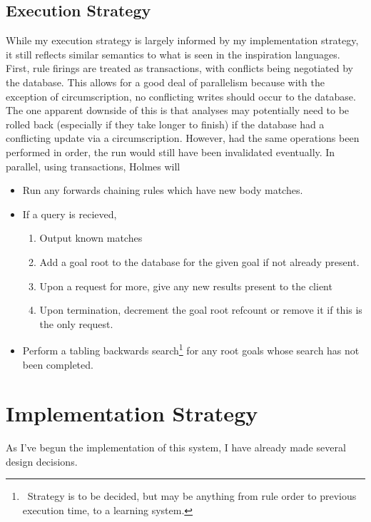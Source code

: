 \subsection{Execution Strategy}
While my execution strategy is largely informed by my implementation strategy, it still reflects similar semantics to what is seen in the inspiration languages.
First, rule firings are treated as transactions, with conflicts being negotiated by the database.
This allows for a good deal of parallelism because with the exception of circumscription, no conflicting writes should occur to the database.
The one apparent downside of this is that analyses may potentially need to be rolled back (especially if they take longer to finish) if the database had a conflicting update via a circumscription.
However, had the same operations been performed in order, the run would still have been invalidated eventually.
In parallel, using transactions, Holmes will
\begin{itemize}
\item Run any forwards chaining rules which have new body matches. 
\item If a query is recieved,
        \begin{enumerate}
                \item Output known matches
                \item Add a goal root to the database for the given goal if not already present.
                \item Upon a request for more, give any new results present to the client
                \item Upon termination, decrement the goal root refcount or remove it if this is the only request.
        \end{enumerate}
\item Perform a tabling backwards search\footnote{\
                Strategy is to be decided, but may be anything from rule order to previous execution time, to a learning system.
        } for any root goals whose search has not been completed.
\end{itemize}

\section{Implementation Strategy}
As I've begun the implementation of this system, I have already made several design decisions.

